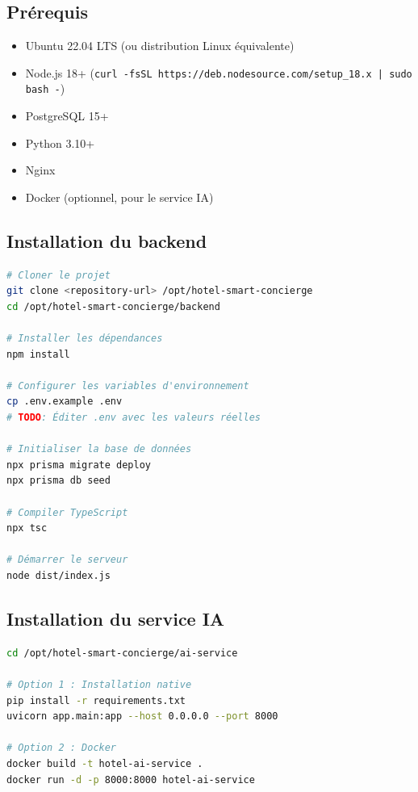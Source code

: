 

\subsection*{Prérequis}

\begin{itemize}
  \item Ubuntu 22.04 LTS (ou distribution Linux équivalente)
  \item Node.js 18+ (\texttt{curl -fsSL https://deb.nodesource.com/setup\_18.x | sudo bash -})
  \item PostgreSQL 15+
  \item Python 3.10+
  \item Nginx
  \item Docker (optionnel, pour le service IA)
\end{itemize}

\subsection*{Installation du backend}

\begin{lstlisting}[language=bash]
# Cloner le projet
git clone <repository-url> /opt/hotel-smart-concierge
cd /opt/hotel-smart-concierge/backend

# Installer les dépendances
npm install

# Configurer les variables d'environnement
cp .env.example .env
# TODO: Éditer .env avec les valeurs réelles

# Initialiser la base de données
npx prisma migrate deploy
npx prisma db seed

# Compiler TypeScript
npx tsc

# Démarrer le serveur
node dist/index.js
\end{lstlisting}

\subsection*{Installation du service IA}

\begin{lstlisting}[language=bash]
cd /opt/hotel-smart-concierge/ai-service

# Option 1 : Installation native
pip install -r requirements.txt
uvicorn app.main:app --host 0.0.0.0 --port 8000

# Option 2 : Docker
docker build -t hotel-ai-service .
docker run -d -p 8000:8000 hotel-ai-service
\end{lstlisting}


